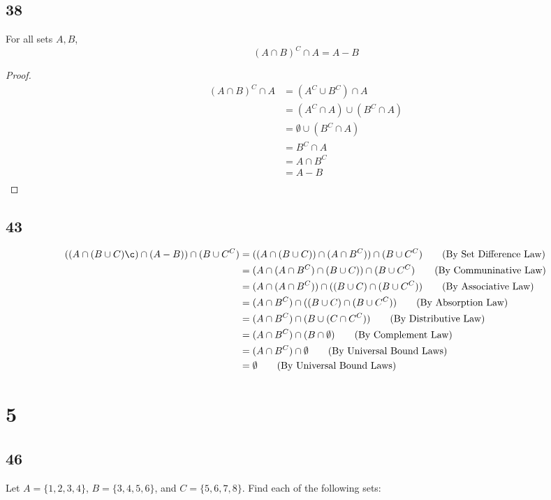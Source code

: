 \documentclass{article}
\begin{document}
\subsection{38}
For all sets $A, B$, 
\[
(A \cap B )^C \cap A = A - B 
\]
\begin{proof}
    \begin{align*}
        (A \cap B)^C \cap A &= (A^C \cup B^C) \cap A \tag{By DeMorgan's Law}\\
        &= (A^C \cap A) \cup (B^C \cap A) \tag{By Distributive Law}\\
        &= \emptyset \cup (B^C \cap A) \tag{By Complement Law}\\
        &= B^C \cap A \tag{By Identity Law}\\
        &= A \cap B^C \tag{By Communitative Law}\\
        &= A - B \tag{By Set Difference Law}\\
    \end{align*}
\end{proof}
\subsection{43}
\begin{align*}
    ((A \cap (B \cup C) \c) \cap (A - B)) \cap (B \cup C^C) &= ((A \cap (B \cup C)) \cap (A \cap B^C)) \cap (B \cup C^C) \tag{By Set Difference Law}\\
    &= (A \cap (A \cap B^C) \cap (B\cup C)) \cap (B \cup C^C)\tag{By Communinative Law}\\
    &= (A \cap (A \cap B^C)) \cap ((B \cup C) \cap (B \cup C^C)) \tag{By Associative Law}\\
    &= (A\cap B^C) \cap ((B \cup C) \cap (B \cup C^C)) \tag{By Absorption Law}\\
    &= (A\cap B^C) \cap (B \cup (C \cap C^C))\tag{By Distributive Law}\\
    &= (A\cap B^C) \cap (B \cap \emptyset) \tag{By Complement Law}\\
    &= (A\cap B^C) \cap \emptyset \tag{By Universal Bound Laws}\\
    &= \emptyset \tag{By Universal Bound Laws}\\
\end{align*}

\section{5}
\subsection{46}
Let $A = \{1, 2, 3, 4\}$, $B = \{3, 4, 5, 6\}$, and $C = \{5, 6, 7, 8\}$. Find each of the following sets:
\end{document}

